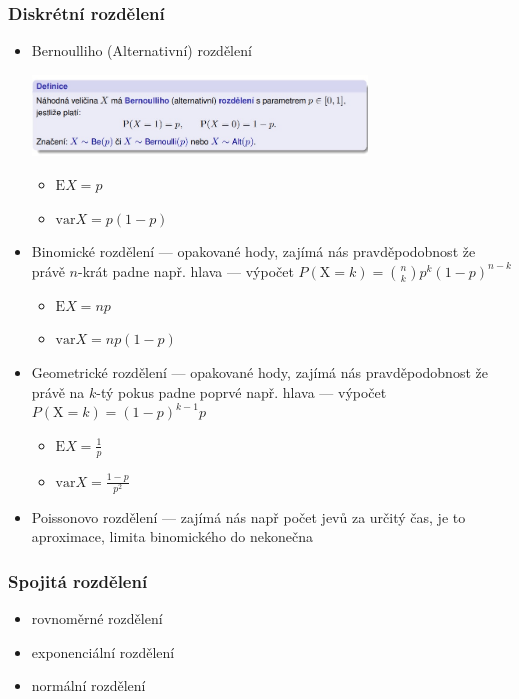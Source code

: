 \subsubsection*{Diskrétní rozdělení}
\begin{itemize}
	\item Bernoulliho (Alternativní) rozdělení
	
	\includegraphics[width=0.7\textwidth]{img/SP-26_1.jpg}
	
	\begin{itemize}
		\item $\text{E}X = p$
		\item $\text{var}X = p(1-p)$
	\end{itemize}
	
	\item Binomické rozdělení --- opakované hody, zajímá nás pravděpodobnost že právě $n$-krát padne např. hlava --- výpočet $P(\text{X} = k) = \binom{n}{k} p^k (1-p)^{n-k}$
	\begin{itemize}
		\item $\text{E}X = np$
		\item $\text{var}X = np(1-p)$
	\end{itemize}
	
	\item Geometrické rozdělení --- opakované hody, zajímá nás pravděpodobnost že právě na $k$-tý pokus padne poprvé např. hlava --- výpočet $P(\text{X} = k) = (1-p)^{k-1} p$
	\begin{itemize}
		\item $\text{E}X = \frac{1}{p}$
		\item $\text{var}X = \frac{1-p}{p^2}$
	\end{itemize}
	
	\item Poissonovo rozdělení --- zajímá nás např počet jevů za určitý čas, je to aproximace, limita binomického do nekonečna
	
\end{itemize}

\subsubsection*{Spojitá rozdělení}
\begin{itemize}
	\item rovnoměrné rozdělení
	\item exponenciální rozdělení
	\item normální rozdělení
\end{itemize}


